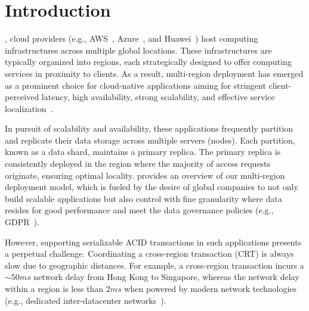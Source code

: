 \section{Introduction}\label{sec:intro}
\vspace{-1pt}


, cloud providers (e.g., AWS~\cite{aws:region}, Azure~\cite{azure:region}, and Huawei~\cite{huawei:region}) host computing infrastructures across multiple global locations. These infrastructures are typically organized into regions, each strategically designed to offer computing services in proximity to clients. As a result, multi-region deployment has emerged as a prominent choice for cloud-native applications aiming for stringent client-perceived latency, high availability, strong scalability, and effective service localization~\cite{dast:eurosys21, ov:vldb19, taft2020cockroachdb, vanbenschoten2022enabling, zhang2018building}.

In pursuit of scalability and availability, these applications frequently partition and replicate their data storage across multiple servers (nodes). Each partition, known as a data shard, maintains a primary replica. The primary replica is consistently deployed in the region where the majority of access requests originate, ensuring optimal locality.  provides an overview of our multi-region deployment model, which is fueled by the desire of global companies to not only build scalable applications but also control with fine granularity where data resides for good performance and meet the data governance policies (e.g., GDPR~\cite{GeneralD60:online}).



However, supporting serializable ACID transactions in such applications presents a perpetual challenge. Coordinating a cross-region transaction (CRT) is always slow due to geographic distances. For example, a cross-region transaction incurs a $\sim50ms$ network delay from Hong Kong to Singapore, whereas the network delay within a region is less than $2ms$ when powered by modern network technologies (e.g., dedicated inter-datacenter networks~\cite{aws:region}). 

